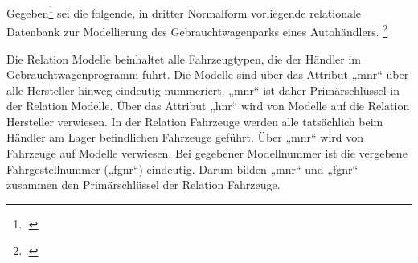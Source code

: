 \documentclass{bschlangaul-aufgabe}
\begin{document}

Gegeben\footcite[Aufgabe 3]{db:ab:7} sei die folgende, in dritter
Normalform vorliegende relationale Datenbank
zur Modellierung des Gebrauchtwagenparks eines Autohändlers.
\footcite[Aufgabe 4 Seite 3-4]{examen:66111:1996:09}

Die Relation Modelle beinhaltet alle Fahrzeugtypen, die der Händler im
Gebrauchtwagenprogramm führt. Die Modelle sind über das Attribut „mnr“
über alle Hersteller hinweg eindeutig nummeriert. „mnr“ ist daher
Primärschlüssel in der Relation Modelle. Über das Attribut „hnr“ wird
von Modelle auf die Relation Hersteller verwiesen. In der Relation
Fahrzeuge werden alle tatsächlich beim Händler am Lager befindlichen
Fahrzeuge geführt. Über „mnr“ wird von Fahrzeuge auf Modelle verwiesen.
Bei gegebener Modellnummer ist die vergebene Fahrgestellnummer („fgnr“)
eindeutig. Darum bilden „mnr“ und „fgnr“ zusammen den Primärschlüssel
der Relation Fahrzeuge.
\end{document}
